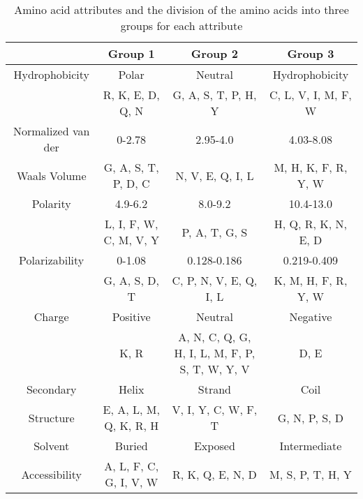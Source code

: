 \begin{table}[htbp]
  \centering
  \caption{Amino acid attributes and the division of the amino acids into three groups for each attribute}
  \scriptsize{
    \begin{tabular}{cccc}
    \addlinespace
    \toprule
          & \textbf{Group 1} & \textbf{Group 2} & \textbf{Group 3} \\
    \midrule
    Hydrophobicity & Polar & Neutral & Hydrophobicity \\
          & R, K, E, D, Q, N & G, A, S, T, P, H, Y & C, L, V, I, M, F, W \\
          \midrule
    Normalized van der  & 0-2.78  & 2.95-4.0  & 4.03-8.08 \\
    Waals Volume    & G, A, S, T, P, D, C & N, V, E, Q, I, L  & M, H, K, F, R, Y, W \\
    \midrule
    Polarity & 4.9-6.2  & 8.0-9.2  & 10.4-13.0 \\
          & L, I, F, W, C, M, V, Y  & P, A, T, G, S  & H, Q, R, K, N, E, D \\
          \midrule
    Polarizability & 0-1.08  & 0.128-0.186  & 0.219-0.409 \\
          & G, A, S, D, T & C, P, N, V, E, Q, I, L  & K, M, H, F, R, Y, W \\
          \midrule
    Charge & Positive  & Neutral  & Negative \\
          & K, R  & \tiny{A, N, C, Q, G, H, I, L, M, F, P, S, T, W, Y, V}  & D, E \\
          \midrule
    Secondary & Helix  & Strand  & Coil \\
    Structure & E, A, L, M, Q, K, R, H  & V, I, Y, C, W, F, T  & G, N, P, S, D \\
    \midrule
    Solvent  & Buried  & Exposed  & Intermediate \\
    Accessibility & A, L, F, C, G, I, V, W  & R, K, Q, E, N, D  & M, S, P, T, H, Y \\
    \bottomrule
    \end{tabular}
  }
  \label{tab:ctd}
\end{table}

